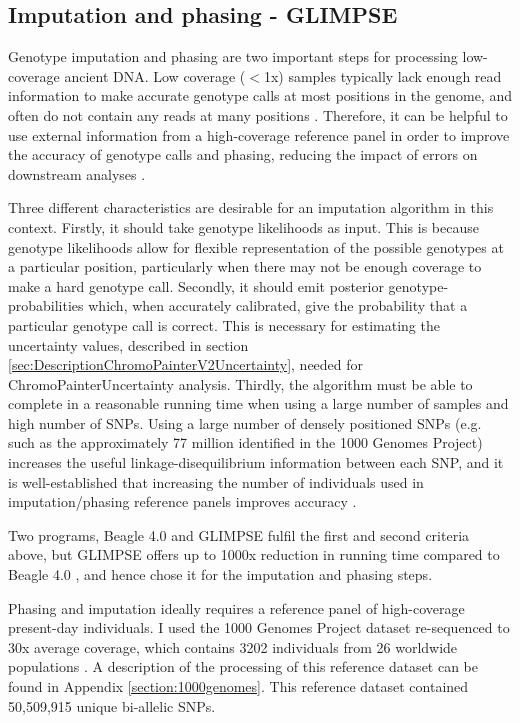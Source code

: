 {\subsection{Imputation and phasing - GLIMPSE}

Genotype imputation and phasing are two important steps for processing low-coverage ancient DNA. Low coverage ($<$1x) samples typically lack enough read information to make accurate genotype calls at most positions in the genome, and often do not contain any reads at many positions \cite{nielsen2011genotype}. Therefore, it can be helpful to use external information from a high-coverage reference panel in order to improve the accuracy of genotype calls and phasing, reducing the impact of errors on downstream analyses \cite{rubinacci2021efficient}. 

Three different characteristics are desirable for an imputation algorithm in this context. Firstly, it should take genotype likelihoods as input. This is because genotype likelihoods allow for flexible representation of the possible genotypes at a particular position, particularly when there may not be enough coverage to make a hard genotype call. Secondly, it should emit posterior genotype-probabilities which, when accurately calibrated, give the probability that a particular genotype call is correct. This is necessary for estimating the uncertainty values, described in section \ref{sec:DescriptionChromoPainterV2Uncertainty}, needed for ChromoPainterUncertainty analysis. Thirdly, the algorithm must be able to complete in a reasonable running time when using a large number of samples and high number of SNPs. Using a large number of densely positioned SNPs (e.g. such as the approximately 77 million identified in the 1000 Genomes Project) increases the useful linkage-disequilibrium information between each SNP, and it is well-established that increasing the number of individuals used in imputation/phasing reference panels improves accuracy \cite{delaneau2018integrative, HUANG2009235, mccarthy2016reference, rubinacci2021efficient}. 

Two programs, Beagle 4.0 \cite{Browning2007} and GLIMPSE \cite{rubinacci2021efficient} fulfil the first and second criteria above, but GLIMPSE offers up to 1000x reduction in running time compared to Beagle 4.0 \cite{rubinacci2021efficicanent}, and hence chose it for the imputation and phasing steps.   

Phasing and imputation ideally requires a reference panel of high-coverage present-day individuals. I used the 1000 Genomes Project dataset re-sequenced to 30x average coverage, which contains 3202 individuals from 26 worldwide populations \cite{byrska2021high}. A description of the processing of this reference dataset can be found in Appendix \ref{section:1000genomes}. This reference dataset contained 50,509,915 unique bi-allelic SNPs. 

}
